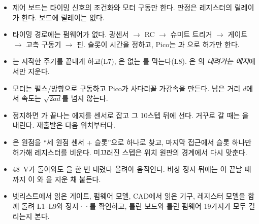 \begin{itemize}
\item 제어 보드는 타이밍 신호의 조건화와 모터 구동만 한다. 판정은 레지스터의 릴레이가 한다. 보드에 릴레이는 없다.
\item 타이밍 경로에는 펌웨어가 없다. 광센서 $\to$ RC $\to$ 슈미트 트리거 $\to$ 게이트 $\to$ 고측 구동기 $\to$ 핀. 슬롯이 시간을
정하고, Pico는 과 으로 허가만 한다.
\item {}는 시작한 주기를 끝내게 하고(L7), 은  없는 를 막는다(L8). 은
의 \emph{내려가는 에지}에서만 지운다.
\item 모터는 펄스/방향으로 구동하고 Pico가 사다리꼴 가감속을 만든다. 남은 거리 $d$에서 속도는 $\sqrt{2ad}$를 넘지 않는다.
\item 정지하면 가 끝나는 에지를 센서로 잡고 그 10스텝 뒤에 선다. 거꾸로 갈 때는 을 내린다. 재출발은 다음
위치부터다.
\item {}은 원점을 ``세 원점 센서 +  슬롯''으로 하나로 찾고, 마지막 접근에서  슬롯 하나만 허가해
레지스터를 비운다. 미끄러진 스텝은 위치 원판의 경계에서 다시 맞춘다.
\item 48~V가 돌아와도 을 한 번 내렸다 올려야 움직인다. 비상 정지 뒤에는 이 끝날 때까지 이
와 을 지운 채 붙든다.
\item 넷리스트에서 읽은 게이트, 펌웨어 모델, CAD에서 읽은 기구, 레지스터 모델을 함께 돌려 L1--L9와 정지··를
확인하고, 틀린 보드와 틀린 펌웨어 19가지가 모두 걸리는지 본다.
\end{itemize}
